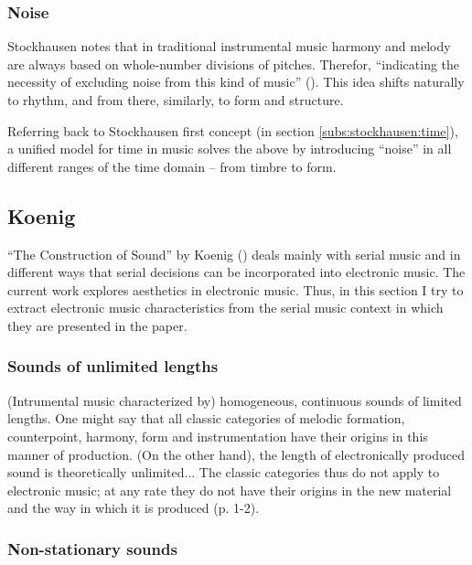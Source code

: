 \documentclass[a4paper,11pt]{article}
\newenvironment{MyShadequote}[1][]
    {\begin{mdframed}[style=MyShadeQuoteStyle,#1]}
    {\end{mdframed}}
\begin{document}
\subsubsection{Noise}
\label{subs:stockhausen:noise}

Stockhausen notes that in traditional instrumental music harmony and melody are always based on whole-number divisions of pitches.
Therefor, ``indicating the necessity of excluding noise from this kind of music'' (\cite[p. 47]{stockhausen}).
This idea shifts naturally to rhythm, and from there, similarly, to form and structure.

Referring back to Stockhausen first concept (in section \ref{subs:stockhausen:time}), a unified model for time in music solves the above by introducing ``noise'' in all different ranges of the time domain -- from timbre to form.

\subsection{Koenig}
\label{sub:eshtetic_koenig}

``The Construction of Sound'' by Koenig (\cite*{koenig}) deals mainly with serial music and in different ways that serial decisions can be incorporated into electronic music.
The current work explores aesthetics in electronic music.
Thus, in this section I try to extract electronic music characteristics from the serial music context in which they are presented in the paper.

\subsubsection{Sounds of unlimited lengths}
\label{subs:koenig:lengths}

\begin{MyShadequote}
  (Intrumental music characterized by) homogeneous, continuous sounds of limited lengths.
  One might say that all classic categories of melodic formation, counterpoint, harmony, form and instrumentation have their origins in this manner of production.
  (On the other hand), the length of electronically produced sound is theoretically unlimited...
  The classic categories thus do not apply to electronic music;
  at any rate they do not have their origins in the new material and the way in which it is produced (p. 1-2).
\end{MyShadequote}

\subsubsection{Non-stationary sounds}
\label{subs:koenig:nonstationary}
\end{document}
